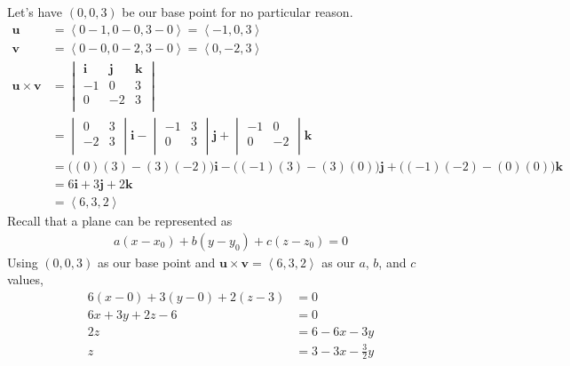 \documentclass{article}
\newcommand{\lra}[1]{\left\langle #1 \right\rangle}
\begin{document}
Let's have $(0,0,3)$ be our base point for no particular reason.
\begin{align*}
    \mathbf{u}&=\lra{0-1,0-0,3-0}=\lra{-1,0,3}\\
    \mathbf{v}&=\lra{0-0,0-2,3-0}=\lra{0,-2,3}\\
    \mathbf{u}\times\mathbf{v}&=\begin{vmatrix}
\mathbf{i} & \mathbf{j} & \mathbf{k}\\
-1 & 0 & 3\\
0 & -2 & 3\\
\end{vmatrix}\\
&=\begin{vmatrix}
0 & 3\\
-2 & 3\\
\end{vmatrix}\mathbf{i}-
\begin{vmatrix}
-1 & 3\\
0 & 3\\
\end{vmatrix}\mathbf{j}+
\begin{vmatrix}
-1 & 0\\
0 & -2\\
\end{vmatrix}\mathbf{k}\\
&=\big(\left(0\right)\left(3\right)-\left(3\right)\left(-2\right)\big)\mathbf{i}-\big(\left(-1\right)\left(3\right)-\left(3\right)\left(0\right)\big)\mathbf{j}+\big(\left(-1\right)\left(-2\right)-\left(0\right)\left(0\right)\big)\mathbf{k}\\
&= 6\mathbf{i}+3\mathbf{j}+2\mathbf{k}\\
&=\lra{6,3,2}
\end{align*}
Recall that a plane can be represented as 
\begin{align*}
    a(x-x_0)+b(y-y_0)+c(z-z_0)=0
\end{align*}
Using $(0,0,3)$ as our base point and $\mathbf{u}\times\mathbf{v}=\lra{6,3,2}$ as our $a$, $b$, and $c$ values,
\begin{align*}
    6(x-0)+3(y-0)+2(z-3)&=0\\
    6x+3y+2z-6&=0\\
    2z&=6-6x-3y\\
    z&=3-3x-\frac{3}{2}y
\end{align*}
\end{document}
